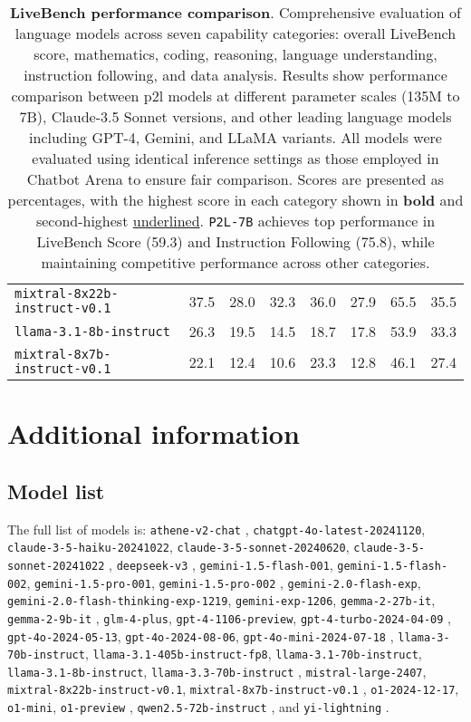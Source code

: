 \begin{table}[H]
\begin{tabular}{lccccccc}
\texttt{mixtral-8x22b-instruct-v0.1} & 37.5 & 28.0 & 32.3 & 36.0 & 27.9 & 65.5 & 35.5 \\
\texttt{llama-3.1-8b-instruct} & 26.3 & 19.5 & 14.5 & 18.7 & 17.8 & 53.9 & 33.3 \\
\texttt{mixtral-8x7b-instruct-v0.1} & 22.1 & 12.4 & 10.6 & 23.3 & 12.8 & 46.1 & 27.4 \\
\bottomrule
\end{tabular}
\caption{
\footnotesize
\textbf{LiveBench performance comparison}. Comprehensive evaluation of language models across seven capability categories: overall LiveBench score, mathematics, coding, reasoning, language understanding, instruction following, and data analysis. Results show performance comparison between p2l models at different parameter scales (135M to 7B), Claude-3.5 Sonnet versions, and other leading language models including GPT-4, Gemini, and LLaMA variants. All models were evaluated using identical inference settings as those employed in Chatbot Arena to ensure fair comparison. Scores are presented as percentages, with the highest score in each category shown in \textbf{bold} and second-highest \underline{underlined}. 
\texttt{P2L-7B} achieves top performance in LiveBench Score (59.3) and Instruction Following (75.8), while maintaining competitive performance across other categories.}
\label{tab:livebench_table}
\end{table}

\section{Additional information}
\subsection{Model list}
\label{app:model-list}
The full list of models is: \texttt{athene-v2-chat} \citep{frickathene}, \texttt{chatgpt-4o-latest-20241120}, \texttt{claude-3-5-haiku-20241022}, \texttt{claude-3-5-sonnet-20240620}, \texttt{claude-3-5-sonnet-20241022} \citep{claude32024family}, \texttt{deepseek-v3} \citep{liu2024deepseek}, \texttt{gemini-1.5-flash-001}, \texttt{gemini-1.5-flash-002}, \texttt{gemini-1.5-pro-001}, \texttt{gemini-1.5-pro-002} \citep{team2024gemini}, \texttt{gemini-2.0-flash-exp}, \texttt{gemini-2.0-flash-thinking-exp-1219}, \texttt{gemini-exp-1206}, \texttt{gemma-2-27b-it}, \texttt{gemma-2-9b-it} \citep{team2024gemma}, \texttt{glm-4-plus}, \texttt{gpt-4-1106-preview}, \texttt{gpt-4-turbo-2024-04-09} \citep{openai2023gpt4turbo}, \texttt{gpt-4o-2024-05-13}, \texttt{gpt-4o-2024-08-06}, \texttt{gpt-4o-mini-2024-07-18} \citep{openai2024gpt4o}, \texttt{llama-3-70b-instruct}, \texttt{llama-3.1-405b-instruct-fp8}, \texttt{llama-3.1-70b-instruct}, \texttt{llama-3.1-8b-instruct}, \texttt{llama-3.3-70b-instruct} \citep{llama3modelcard}, \texttt{mistral-large-2407}, \texttt{mixtral-8x22b-instruct-v0.1}, \texttt{mixtral-8x7b-instruct-v0.1} \citep{jiang2024mixtral}, \texttt{o1-2024-12-17}, \texttt{o1-mini}, \texttt{o1-preview} \citep{jaech2024openai}, \texttt{qwen2.5-72b-instruct} \citep{qwen2.5}, and \texttt{yi-lightning} \citep{ai2024yi}.
